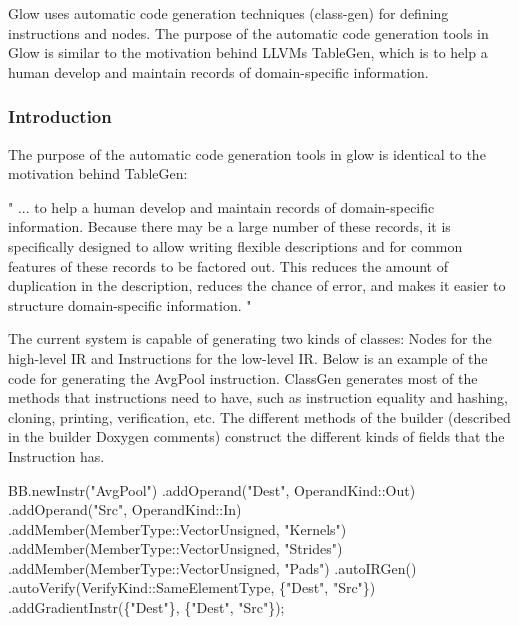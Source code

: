 Glow uses automatic code generation techniques (class-\/gen) for defining instructions and nodes. The purpose of the automatic code generation tools in Glow is similar to the motivation behind L\+L\+VM\textquotesingle{}s Table\+Gen, which is to help a human develop and maintain records of domain-\/specific information.

\subsubsection*{Introduction}

The purpose of the automatic code generation tools in glow is identical to the motivation behind Table\+Gen\+:

" ... to help a human develop and maintain records of domain-\/specific information. Because there may be a large number of these records, it is specifically designed to allow writing flexible descriptions and for common features of these records to be factored out. This reduces the amount of duplication in the description, reduces the chance of error, and makes it easier to structure domain-\/specific information. "

The current system is capable of generating two kinds of classes\+: Nodes for the high-\/level IR and Instructions for the low-\/level IR. Below is an example of the code for generating the Avg\+Pool instruction. Class\+Gen generates most of the methods that instructions need to have, such as instruction equality and hashing, cloning, printing, verification, etc. The different methods of the builder (described in the builder Doxygen comments) construct the different kinds of fields that the Instruction has.


\begin{DoxyCode}
BB.newInstr("AvgPool")
    .addOperand("Dest", OperandKind::Out)
    .addOperand("Src", OperandKind::In)
    .addMember(MemberType::VectorUnsigned, "Kernels")
    .addMember(MemberType::VectorUnsigned, "Strides")
    .addMember(MemberType::VectorUnsigned, "Pads")
    .autoIRGen()
    .autoVerify(VerifyKind::SameElementType, \{"Dest", "Src"\})
    .addGradientInstr(\{"Dest"\}, \{"Dest", "Src"\});
\end{DoxyCode}
 